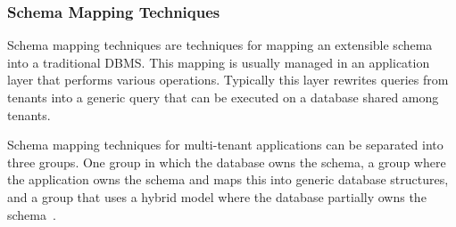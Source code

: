 \subsubsection{Schema Mapping Techniques}
Schema mapping techniques are techniques for mapping an extensible schema into a traditional \ac{DBMS}.
This mapping is usually managed in an application layer that performs various operations. 
Typically this layer rewrites queries from tenants into a generic query that can be executed on a database shared among tenants.

Schema mapping techniques for multi-tenant applications can be separated into three groups. 
One group in which the database owns the schema, a group where the application owns the schema and maps this into generic database structures, and a group that uses a hybrid model where the database partially owns the schema~\cite{aulbach2009comparison}.

